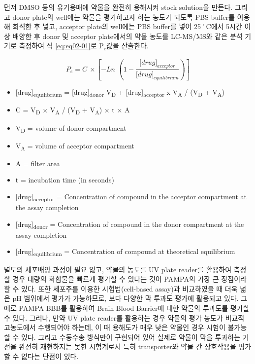 \documentclass[
  11pt,
  krantz2, a4paper, twoside]{krantz}
\providecommand{\tightlist}{%
  \setlength{\itemsep}{0pt}\setlength{\parskip}{0pt}}
\begin{document}
먼저 DMSO 등의 유기용매에 약물을 완전히 용해시켜 stock solution을
만든다. 그리고 donor plate의 well에는 약물을 평가하고자 하는 농도가
되도록 PBS buffer를 이용해 희석한 후 넣고, acceptor plate의 well에는 PBS
buffer를 넣어 25˚C에서 5시간 이상 배양한 후 donor 및 acceptor
plate에서의 약물 농도를 LC-MS/MS와 같은 분석 기기로 측정하여 식
\eqref{eq:eq02-01}로 P\textsubscript{e}값을 산출한다.

\begin{equation}
P_{e} = C\  \times \left\lbrack - Ln\mspace{6mu}\left( 1 - \frac{\lbrack drug\rbrack_{acceptor}}{\lbrack drug\rbrack_{equilibrium}} \right) \right\rbrack
\label{eq:eq02-01} 
\end{equation}

\begin{itemize}
\tightlist
\item
  {[}drug{]}\textsubscript{equilibrium} = {[}drug{]}\textsubscript{donor} V\textsubscript{D} + {[}drug{]}\textsubscript{acceptor} x V\textsubscript{A} / (V\textsubscript{D} + V\textsubscript{A})
\item
  C = V\textsubscript{D} × V\textsubscript{A} / (V\textsubscript{D} + V\textsubscript{A}) × t × A
\item
  V\textsubscript{D} = volume of donor compartment
\item
  V\textsubscript{A} = volume of acceptor compartment
\item
  A = filter area
\item
  t = incubation time (in seconds)
\item
  {[}drug{]}\textsubscript{acceptor} = Concentration of compound in the acceptor compartment at the assay completion
\item
  {[}drug{]}\textsubscript{donor} = Concentration of compound in the donor compartment at the assay completion
\item
  {[}drug{]}\textsubscript{equilibrium} = Concentration of compound at theoretical equilibrium
\end{itemize}

별도의 세포배양 과정이 필요 없고, 약물의 농도를 UV plate reader를
활용하여 측정할 경우 대량의 화합물을 빠르게 평가할 수 있다는 것이
PAMPA의 가장 큰 장점이라 할 수 있다. 또한 세포주를 이용한
시험법(cell-based assay)과 비교하였을 때 더욱 넓은 pH 범위에서 평가가
가능하므로, 보다 다양한 막 투과도 평가에 활용되고 있다. 그 예로
PAMPA-BBB를 활용하여 Brain-Blood Barrier에 대한 약물의 투과도를 평가할
수 있다. 그러나, 만약 UV plate reader를 활용하는 경우 약물의 평가 농도가
비교적 고농도에서 수행되어야 하는데, 이 때 용해도가 매우 낮은 약물인
경우 시험이 불가능할 수 있다. 그리고 수동수송 방식만이 구현되어 있어
실제로 약물이 막을 투과하는 기전을 완전히 재현하지는 못한 시험계로서
특히 transporter와 약물 간 상호작용을 평가할 수 없다는 단점이 있다.
\end{document}

